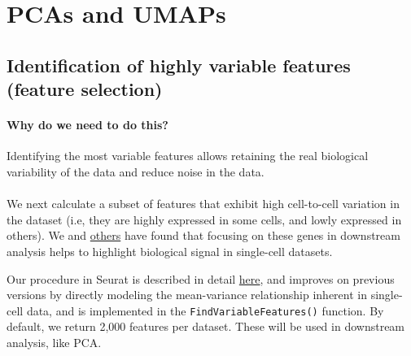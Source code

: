 \documentclass[
]{book}
\begin{document}
\hypertarget{reducedims}{%
\chapter{PCAs and UMAPs}\label{reducedims}}

\hypertarget{identification-of-highly-variable-features-feature-selection}{%
\section{Identification of highly variable features (feature selection)}\label{identification-of-highly-variable-features-feature-selection}}

\hypertarget{why-do-we-need-to-do-this-2}{%
\subsubsection*{Why do we need to do this?}\label{why-do-we-need-to-do-this-2}}

Identifying the most variable features allows retaining the real biological variability of the data and reduce noise in the data.

\hypertarget{section-4}{%
\subsubsection*{}\label{section-4}}

We next calculate a subset of features that exhibit high cell-to-cell variation in the dataset (i.e, they are highly expressed in some cells, and lowly expressed in others). We and \href{https://www.nature.com/articles/nmeth.2645}{others} have found that focusing on these genes in downstream analysis helps to highlight biological signal in single-cell datasets.

Our procedure in Seurat is described in detail \href{https://doi.org/10.1016/j.cell.2019.05.031}{here}, and improves on previous versions by directly modeling the mean-variance relationship inherent in single-cell data, and is implemented in the \texttt{FindVariableFeatures()} function. By default, we return 2,000 features per dataset. These will be used in downstream analysis, like PCA.
\end{document}
